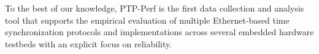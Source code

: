 To the best of our knowledge, PTP-Perf is the first data collection and
analysis tool %
that supports the empirical evaluation of multiple Ethernet-based time
synchronization protocols and implementations across several embedded hardware
testbeds with an explicit focus on reliability. %

%
